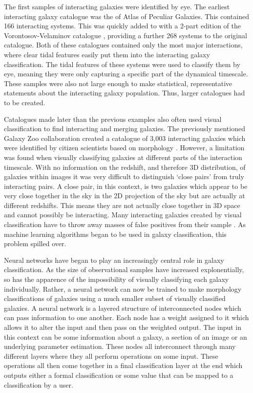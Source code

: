 The first samples of interacting galaxies were identified by eye. The earliest interacting galaxy catalogue was the \citet{1966ApJS...14....1A} of Atlas of Peculiar Galaxies. This contained 166 interacting systems. This was quickly added to with a 2-part edition of the Vorontosov-Velaminov catalogue \citep{1977A&AS...28....1V}, providing a further 268 systems to the original \citet{1966ApJS...14....1A} catalogue. Both of these catalogues contained only the most major interactions, where clear tidal features easily put them into the interacting galaxy classification. The tidal features of these systems were used to classify them by eye, meaning they were only capturing a specific part of the dynamical timescale. These samples were also not large enough to make statistical, representative statements about the interacting galaxy population. Thus, larger catalogues had to be created.

Catalogues made later than the previous examples also often used visual classification to find interacting and merging galaxies. The previously mentioned Galaxy Zoo collaboration created a catalogue of 3,003 interacting galaxies which were identified by citizen scientists based on morphology \citep{2010MNRAS.401.1043D}. However, a limitation was found when visually classifying galaxies at different parts of the interaction timescale. With no information on the redshift, and therefore 3D distribution, of galaxies within images it was very difficult to distinguish `close pairs' from truly interacting pairs. A close pair, in this context, is two galaxies which appear to be very close together in the sky in the 2D projection of the sky but are actually at different redshifts. This means they are not actually close together in 3D space and cannot possibly be interacting. Many interacting galaxies created by visual classification have to throw away masses of false positives from their sample \citep{2020MNRAS.492.2075B, 2022A&A...661A..52P}. As machine learning algorithms began to be used in galaxy classification, this problem spilled over.

Neural networks have began to play an increasingly central role in galaxy classification. As the size of observational samples have increased explonentially, so has the apparence of the impossibility of visually classifying each galaxy individually. Rather, a neural network can now be trained to make morphology classifications of galaxies using a much smaller subset of visually classified galaxies. A neural network is a layered structure of interconnected nodes which can pass information to one another. Each node has a weight assigned to it which allows it to alter the input and then pass on the weighted output. The input in this context can be some information about a galaxy, a section of an image or an underlying parameter estimation. These nodes all interconnect through many different layers where they all perform operations on some input. These operations all then come together in a final classification layer at the end which outputs either a formal classification or some value that can be mapped to a classification by a user.

